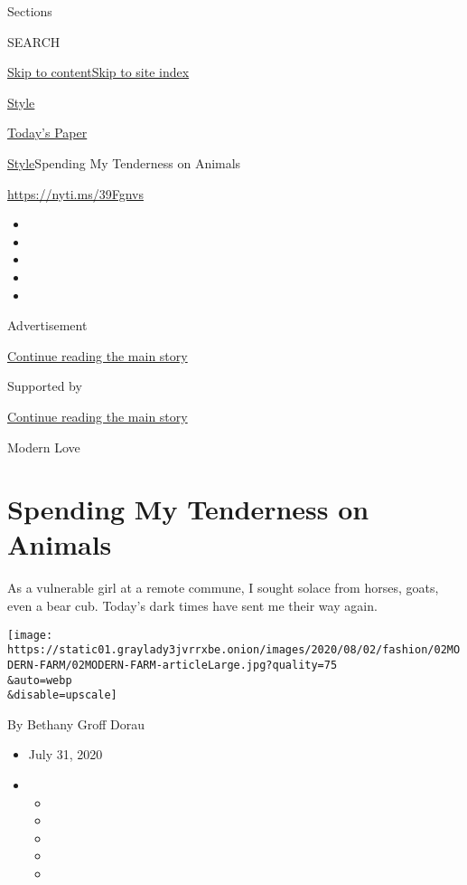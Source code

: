 Sections

SEARCH

\protect\hyperlink{site-content}{Skip to
content}\protect\hyperlink{site-index}{Skip to site index}

\href{https://www.nytimes3xbfgragh.onion/section/style}{Style}

\href{https://myaccount.nytimes3xbfgragh.onion/auth/login?response_type=cookie\&client_id=vi}{}

\href{https://www.nytimes3xbfgragh.onion/section/todayspaper}{Today's
Paper}

\href{/section/style}{Style}\textbar{}Spending My Tenderness on Animals

\url{https://nyti.ms/39Fgnvs}

\begin{itemize}
\item
\item
\item
\item
\item
\end{itemize}

Advertisement

\protect\hyperlink{after-top}{Continue reading the main story}

Supported by

\protect\hyperlink{after-sponsor}{Continue reading the main story}

Modern Love

\hypertarget{spending-my-tenderness-on-animals}{%
\section{Spending My Tenderness on
Animals}\label{spending-my-tenderness-on-animals}}

As a vulnerable girl at a remote commune, I sought solace from horses,
goats, even a bear cub. Today's dark times have sent me their way again.

\texttt{[image: https://static01.graylady3jvrrxbe.onion/images/2020/08/02/fashion/02MODERN-FARM/02MODERN-FARM-articleLarge.jpg?quality=75\\\&auto=webp\\\&disable=upscale]}

By Bethany Groff Dorau

\begin{itemize}
\item
  July 31, 2020
\item
  \begin{itemize}
  \item
  \item
  \item
  \item
  \item
  \end{itemize}
\end{itemize}


